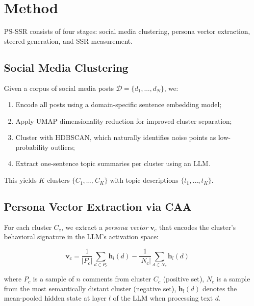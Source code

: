 \documentclass[letterpaper]{article}
\newcommand{\method}{PS-SSR}
\newcommand{\bfv}{\mathbf{v}}
\newcommand{\bfh}{\mathbf{h}}
\begin{document}
\section{Method}
\label{sec:method}

\method{} consists of four stages: social media clustering, persona vector extraction, steered generation, and SSR measurement.

\subsection{Social Media Clustering}

Given a corpus of social media posts $\mathcal{D} = \{d_1, \ldots, d_N\}$, we:
\begin{enumerate}[nosep]
    \item Encode all posts using a domain-specific sentence embedding model;
    \item Apply UMAP dimensionality reduction for improved cluster separation;
    \item Cluster with HDBSCAN, which naturally identifies noise points as low-probability outliers;
    \item Extract one-sentence topic summaries per cluster using an LLM.
\end{enumerate}
This yields $K$ clusters $\{C_1, \ldots, C_K\}$ with topic descriptions $\{t_1, \ldots, t_K\}$.

\subsection{Persona Vector Extraction via CAA}

For each cluster $C_c$, we extract a \emph{persona vector} $\bfv_c$ that encodes the cluster's behavioral signature in the LLM's activation space:

\begin{equation}
    \bfv_c = \frac{1}{|P_c|}\sum_{d \in P_c} \bfh_l(d) - \frac{1}{|N_c|}\sum_{d \in N_c} \bfh_l(d)
    \label{eq:caa}
\end{equation}

where $P_c$ is a sample of $n$ comments from cluster $C_c$ (positive set), $N_c$ is a sample from the most semantically distant cluster (negative set), $\bfh_l(d)$ denotes the mean-pooled hidden state at layer $l$ of the LLM when processing text $d$.
\end{document}
